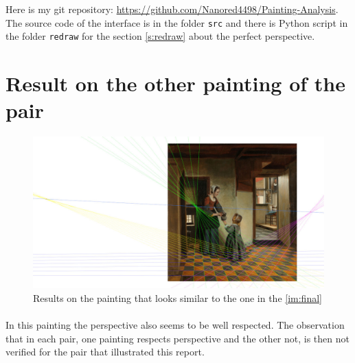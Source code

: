 \documentclass[11pt]{article}
\begin{document}
	Here is my git repository: \url{https://github.com/Nanored4498/Painting-Analysis}. The source code of the interface is in the folder \verb|src| and there is Python script in the folder \verb|redraw| for the section \ref{s:redraw} about the perfect perspective.
	
	\newpage
	\section{Result on the other painting of the pair}
	
	\begin{figure}[h]
		\centering
		\includegraphics[width=\linewidth]{final_bis.jpg}
		\caption{Results on the painting that looks similar to the one in the \figurename \ref{im:final}}
	\end{figure}

	\paragraph{}
	In this painting the perspective also seems to be well respected. The observation that in each pair, one painting respects perspective and the other not, is then not verified for the pair that illustrated this report.
\end{document}
